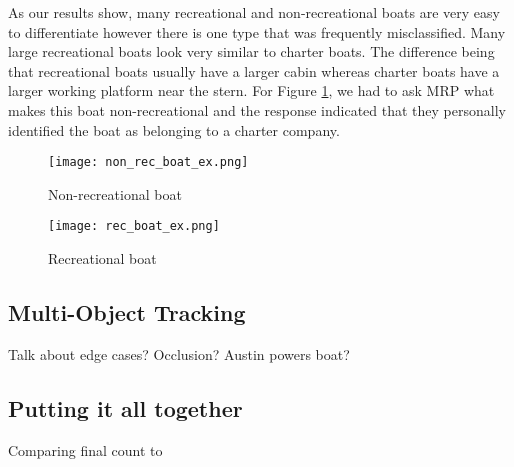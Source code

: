 \documentclass[10pt,twocolumn,letterpaper]{article}
\begin{document}
As our results show, many recreational and non-recreational boats are very easy to differentiate however there is one type that was frequently misclassified. Many large recreational boats look very similar to charter boats. The difference being that recreational boats usually have a larger cabin whereas charter boats have a larger working platform near the stern. For Figure \ref{fig:non_rec_boat}, we had to ask MRP what makes this boat non-recreational and the response indicated that they personally identified the boat as belonging to a charter company.

\begin{figure}
 \center
  \texttt{[image: non\_rec\_boat\_ex.png]}
  \caption{Non-recreational boat}
  \label{fig:non_rec_boat}
\end{figure}

\begin{figure}
 \center
  \texttt{[image: rec\_boat\_ex.png]}
  \caption{Recreational boat}
  \label{fig:rec_boat}
\end{figure}

\subsection{Multi-Object Tracking}

Talk about edge cases? Occlusion? Austin powers boat?

\subsection{Putting it all together}

Comparing final count to 





\begin{comment}





\begin{table}[t]
  \centering
  \begin{tabular}{@{}lc@{}}
    \toprule
    Method & Frobnability \\
    \midrule
    Theirs & Frumpy \\
    Yours & Frobbly \\
    Ours & Makes one's heart Frob\\
    \bottomrule
  \end{tabular}
  \caption{Results.   Ours is better.}
  \label{tab:example}
\end{table}
\end{comment}





{\small


}
\end{document}

